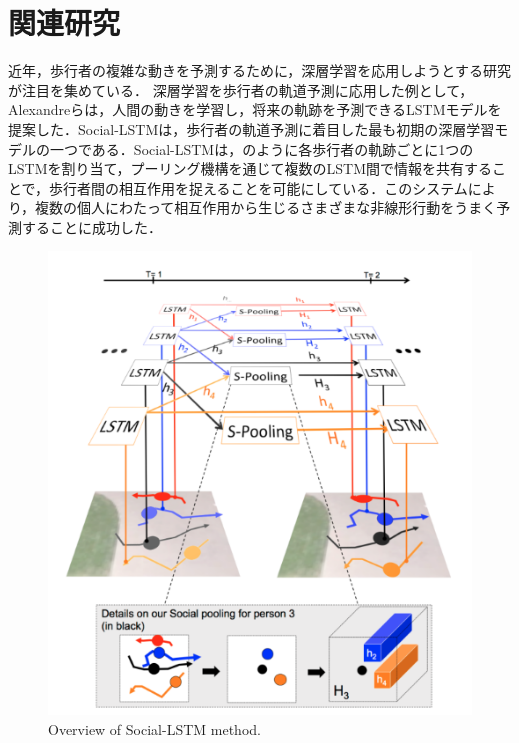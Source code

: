 
\section{関連研究}\label{sec:relate-research}
近年，歩行者の複雑な動きを予測するために，深層学習を応用しようとする研究が注目を集めている．
深層学習を歩行者の軌道予測に応用した例として，Alexandreら\cite{s-lstm}は，人間の動きを学習し，将来の軌跡を予測できるLSTMモデルを提案した．Social-LSTMは，歩行者の軌道予測に着目した最も初期の深層学習モデルの一つである．Social-LSTMは，のように各歩行者の軌跡ごとに1つのLSTMを割り当て，プーリング機構を通じて複数のLSTM間で情報を共有することで，歩行者間の相互作用を捉えることを可能にしている．このシステムにより，複数の個人にわたって相互作用から生じるさまざまな非線形行動をうまく予測することに成功した．

\vspace{-10pt}

\begin{figure}[hbtp]
     \centering
    \includegraphics[keepaspectratio, scale=0.55]
         {images/s-lstm.png}
    \caption{Overview of Social-LSTM method.\protect\footnotemark[1]}
    \label{Fig:s-lstm}
\end{figure}
\protect{}

